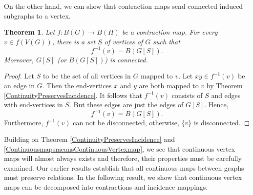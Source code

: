\documentclass{amsart}
\newtheorem{theorem}{Theorem}[section]
\theoremstyle{definition}
\theoremstyle{remark}
\numberwithin{equation}{section}
\begin{document}
	On the other hand, we can show that contraction maps send connected induced subgraphs to a vertex.
	
	\begin{theorem}
		\label{ContractionPreimageConnectedSets}
		Let \(f:B(G) \rightarrow B(H)\) be a contraction map. For every \(v \in f(V(G))\), there is a set \(S\) of vertices of \(G\) such that
		\[f^{-1}(v) = B(G[S]).\]
		Moreover, \(G[S]\) (or \(B(G[S])\)) is connected.
	\end{theorem}
	\begin{proof}
		Let \(S\) to be the set of all vertices in \(G\) mapped to \(v\). Let \(xy \in f^{-1}(v)\) be an edge in \(G\). Then the end-vertices \(x\) and \(y\) are both mapped to \(v\) by Theorem \ref{ContinuityPreservesIncidence}. It follows that \(f^{-1}(v)\) consists of \(S\) and edges with end-vertices in \(S\). But these edges are just the edges of \(G[S]\). Hence,
		\[f^{-1}(v) = B(G[S]).\]
		Furthermore, \(f^{-1}(v)\) can not be disconnected, otherwise, \(\{v\}\) is disconnected.
	\end{proof}
	
	Building on Theorem \ref{ContinuityPreservesIncidence} and \ref{ContinuousmapsmeansContinuousVertexmap}, we see that continuous vertex maps will almost always exists  and therefore, their properties must be carefully examined. Our earlier results establish that all continuous maps between graphs must preserve relations. In the following result, we show that continuous vertex maps can be decomposed into contractions and incidence mappings.
	
\end{document}
